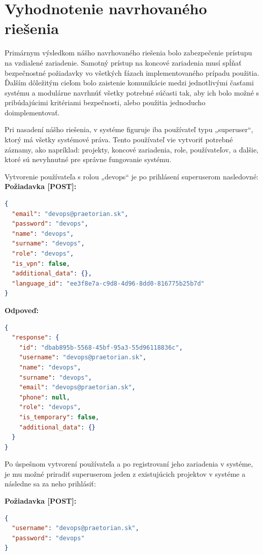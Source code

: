 \chapter{Vyhodnotenie navrhovaného riešenia}\label{ch:vyhodnotenie-navrhovaneho-riesenia}

Primárnym výsledkom nášho navrhovaného riešenia bolo zabezpečenie prístupu na vzdialené zariadenie.
Samotný prístup na koncové zariadenia musí spĺňať bezpečnostné požiadavky vo všetkých fázach implementovaného prípadu
použitia.
Ďalším dôležitým cieľom bolo zaistenie komunikácie medzi jednotlivými časťami systému a modulárne navrhnúť všetky potrebné
súčasti tak, aby ich bolo možné s pribúdajúcimi kritériami bezpečnosti, alebo použitia jednoducho doimplementovať.

Pri nasadení nášho riešenia, v systéme figuruje iba používateľ typu „superuser“, ktorý má všetky systémové práva.
Tento používateľ vie vytvoriť potrebné záznamy, ako napríklad: projekty, koncové zariadenia, role, používateľov, a ďalšie,
ktoré sú nevyhnutné pre správne fungovanie systému.

Vytvorenie používateľa s rolou „devops“ je po prihlásení superuserom nasledovné:
\newpage
\textbf{\large Požiadavka [POST]:}

\begin{lstlisting}[language=json,firstnumber=1]
{
  "email": "devops@praetorian.sk",
  "password": "devops",
  "name": "devops",
  "surname": "devops",
  "role": "devops",
  "is_vpn": false,
  "additional_data": {},
  "language_id": "ee3f8e7a-c9d8-4d96-8dd0-816775b25b7d"
}
\end{lstlisting}

\textbf{\large Odpoveď:}

\begin{lstlisting}[language=json,firstnumber=1]
{
  "response": {
    "id": "dbab895b-5568-45bf-95a3-55d96118836c",
    "username": "devops@praetorian.sk",
    "name": "devops",
    "surname": "devops",
    "email": "devops@praetorian.sk",
    "phone": null,
    "role": "devops",
    "is_temporary": false,
    "additional_data": {}
  }
}
\end{lstlisting}

Po úspešnom vytvorení používateľa a po registrovaní jeho zariadenia v systéme, je mu možné priradiť superuserom jeden z
existujúcich projektov v systéme a následne sa za neho prihlásiť:

\textbf{\large Požiadavka [POST]:}

\begin{lstlisting}[language=json,firstnumber=1]
{
  "username": "devops@praetorian.sk",
  "password": "devops"
}
\end{lstlisting}

